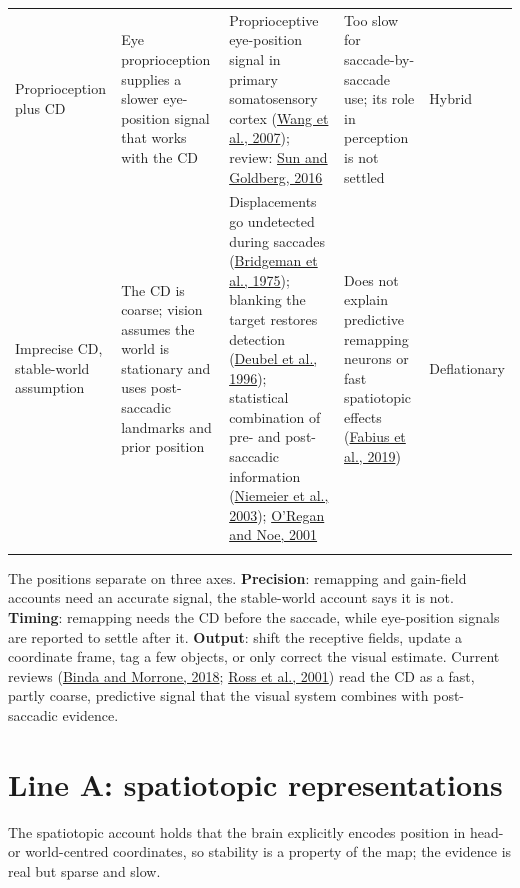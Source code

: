 \documentclass[11pt,a4paper]{article}
\begin{document}
{\begin{longtable}{>{\raggedright\arraybackslash}p{2.12cm}>{\raggedright\arraybackslash}p{3.13cm}>{\raggedright\arraybackslash}p{4.51cm}>{\raggedright\arraybackslash}p{3.31cm}>{\raggedright\arraybackslash}p{1.47cm}}
\addlinespace[2pt]
Proprioception plus CD & Eye proprioception supplies a slower eye-position signal that works with the CD & Proprioceptive eye-position signal in primary somatosensory cortex (\href{https://doi.org/10.1038/nn1878}{Wang et al., 2007}); review: \href{https://doi.org/10.1146/annurev-vision-082114-035407}{Sun and Goldberg, 2016} & Too slow for saccade-by-saccade use; its role in perception is not settled & Hybrid \\
\addlinespace[2pt]
Imprecise CD, stable-world assumption & The CD is coarse; vision assumes the world is stationary and uses post-saccadic landmarks and prior position & Displacements go undetected during saccades (\href{https://doi.org/10.1016/0042-6989(75)90290-4}{Bridgeman et al., 1975}); blanking the target restores detection (\href{https://doi.org/10.1016/0042-6989(95)00203-0}{Deubel et al., 1996}); statistical combination of pre- and post-saccadic information (\href{https://doi.org/10.1038/nature01439}{Niemeier et al., 2003}); \href{https://doi.org/10.1017/S0140525X01000115}{O'Regan and Noe, 2001} & Does not explain predictive remapping neurons or fast spatiotopic effects (\href{https://www.pnas.org/doi/10.1073/pnas.1812210116}{Fabius et al., 2019}) & Deflationary \\
\addlinespace[2pt]
\bottomrule
\end{longtable}}

The positions separate on three axes. \textbf{Precision}: remapping and gain-field accounts need an accurate signal, the stable-world account says it is not. \textbf{Timing}: remapping needs the CD before the saccade, while eye-position signals are reported to settle after it. \textbf{Output}: shift the receptive fields, update a coordinate frame, tag a few objects, or only correct the visual estimate. Current reviews (\href{https://www.annualreviews.org/content/journals/10.1146/annurev-vision-091517-034317}{Binda and Morrone, 2018}; \href{https://doi.org/10.1016/S0166-2236(00)01685-4}{Ross et al., 2001}) read the CD as a fast, partly coarse, predictive signal that the visual system combines with post-saccadic evidence.

\section{Line A: spatiotopic representations}

The spatiotopic account holds that the brain explicitly encodes position in head- or world-centred coordinates, so stability is a property of the map; the evidence is real but sparse and slow.
\end{document}
